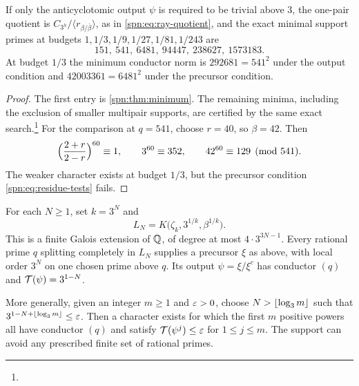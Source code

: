 \begin{proposition}\label{spn:prop:weak-minima}
If only the anticyclotomic output $\psi$ is required to be trivial above $3$,
the one-pair quotient is $C_{3^h}/\langle r_{\beta/\bar\beta}\rangle$, as in
\eqref{spn:eq:ray-quotient}, and the exact minimal support primes at budgets
$1,1/3,1/9,1/27,1/81,1/243$ are
\[
 151,\ 541,\ 6481,\ 94447,\ 238627,\ 1573183 .
\]
At budget $1/3$ the minimum conductor norm is $292681=541^2$ under the output
condition and $42003361=6481^2$ under the precursor condition.
\end{proposition}

\begin{proof}
The first entry is \cref{spn:thm:minimum}. The remaining minima, including
the exclusion of smaller multipair supports, are certified by the same exact
search.\footnote{}
For the comparison at $q=541$, choose $r=40$, so $\beta=42$. Then
\[
 \Bigl(\frac{2+r}{2-r}\Bigr)^{60}\equiv1,\qquad3^{60}\equiv352,\qquad
 42^{60}\equiv129\pmod{541}.
\]
The weaker character exists at budget $1/3$, but the precursor condition
\eqref{spn:eq:residue-tests} fails.
\end{proof}

\begin{theorem}\label{spn:thm:all-budgets}
For each $N\ge1$, set $k=3^N$ and
\[
 L_N=K\bigl(\zeta_k,3^{1/k},\beta^{1/k}\bigr).
\]
This is a finite Galois extension of $\mathbb{Q}$, of degree at most
$4\cdot3^{3N-1}$. Every rational prime $q$ splitting completely in $L_N$
supplies a precursor $\xi$ as above, with local order $3^N$ on one chosen
prime above $q$. Its output $\psi=\xi/\xi^c$ has conductor $(q)$ and
$\mathcal{T}(\psi)=3^{1-N}$.

More generally, given an integer $m\ge1$ and $\varepsilon>0$, choose
$N>\lfloor\log_3m\rfloor$ such that $3^{1-N+\lfloor\log_3m\rfloor}\le\varepsilon$. Then a
character exists for which the first $m$ positive powers all have conductor
$(q)$ and satisfy $\mathcal{T}(\psi^j)\le\varepsilon$ for $1\le j\le m$. The support
can avoid any prescribed finite set of rational primes.
\end{theorem}

